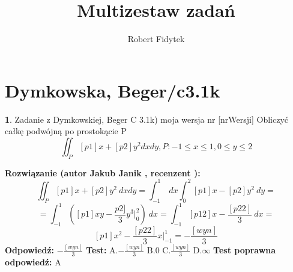 \documentclass[12pt, a4paper]{article}
\title{Multizestaw zadań}
\author{Robert Fidytek}
\date{}
\theoremstyle{definition} %
\newtheorem{zad}{}
\newcommand{\kategoria}[1]{\section{#1}} %
\newcommand{\zadStart}[1]{\begin{zad}#1\newline} %
\newcommand{\zadStop}{\end{zad}}   %
\newcommand{\rozwStart}[2]{\noindent \textbf{Rozwiązanie (autor #1 , recenzent #2): }\newline} %
\newcommand{\rozwStop}{\newline}                                            %
\newcommand{\odpStart}{\noindent \textbf{Odpowiedź:}\newline}    %
\newcommand{\odpStop}{\newline}                                             %
\newcommand{\testStart}{\noindent \textbf{Test:}\newline} %
\newcommand{\testStop}{\newline} %
\newcommand{\kluczStart}{\noindent \textbf{Test poprawna odpowiedź:}\newline} %
\newcommand{\kluczStop}{\newline} %
\begin{document}
\maketitle


\kategoria{Dymkowska, Beger/c3.1k}
\zadStart{Zadanie z Dymkowskiej, Beger C 3.1k) moja wersja nr [nrWersji]}
Obliczyć całkę podwójną po prostokącie P $$\iint_P [p1]x+[p2]y^2dxdy, P: -1\leq x \leq 1, 0 \leq y \leq 2$$
\zadStop
\rozwStart{Jakub Janik}{}
$$\iint_P [p1]x+[p2]y^2\ dxdy=\int_{-1}^1\ dx\int_0^2 [p1]x-[p2]y^2\ dy=$$
$$=\int_{-1}^1 ([p1]xy-\frac{p2]}{3}y^3 \Big|_0^2)\ dx=\int_{-1}^1 [p12]x-\frac{[p22]}{3}\ dx=$$
$$[p1]x^2-\frac{[p22]}{3}x \Big|_{-1}^1=-\frac{[wyn]}{3}$$
\rozwStop
\odpStart
$-\frac{[wyn]}{3}$
\odpStop
\testStart
A.$-\frac{[wyn]}{3}$
B.$0$
C.$\frac{[wyn]}{3}$
D.$\infty$
\testStop
\kluczStart
A
\kluczStop
\end{document}
